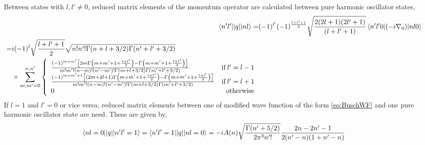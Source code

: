 \documentclass[%
 preprint,
 amsmath,amssymb,
 aps,
]{revtex4-1}
\begin{document}
Between states with $l,l'\neq0$, reduced matrix elements of the momentum operator are calculated between pure harmonic oscillator states,
\begin{align}
\braket{n'l' || q || n l}=&(-1)^{l'}(-1)^{\frac{l+l'+1}{2}}\sqrt{\frac{2(2l+1)(2l'+1)}{(l+l'+1)}}\braket{n'l'0| (-i \nabla_0) | n l 0} \\
\begin{split} =& i(-1)^{l}\sqrt{\frac{l+l'+1}{2}}\sqrt{n!n'!\Gamma(n+l+3/2)\Gamma(n'+l'+3/2)} \\ 
&\times\sum_{m,m'=0}^{n,n'} \left\{
     \begin{array}{lr}
       \frac{(-1)^{m+m'}\left[2m\Gamma\left(m+m'+1+\frac{l+l'}{2}\right)-\Gamma\left(m+m'+1+\frac{l+l'}{2}\right)\right]}{m!m'!(n-m)!(n'-m')!\Gamma(m+l+3/2)\Gamma(m'+l'+3/2)} & \text{if}\: l'=l-1 \\
        \frac{(-1)^{m+m'+1}\left[(2m+2l+1)\Gamma\left(m+m'+1+\frac{l+l'}{2}\right)-\Gamma\left(m+m'+1+\frac{l+l'}{2}\right)\right]}{m!m'!(n-m)!(n'-m')!\Gamma(m+l+3/2)\Gamma(m'+l'+3/2)} & \text{if}\: l'=l+1 \\
       0 & \text{otherwise}
     \end{array}
   \right.
   \end{split}
\end{align}
If $l=1$ and $l'=0$ or vice versa, reduced matrix elements between one of modified wave function of the form \eqref{eq:BuschWF} and one pure harmonic oscillator state are need. These are given by,
\begin{align}
\braket{n l=0 || q || n' l'=1}=\braket{n' l'=1 || q || n l=0}=-i A(n) \sqrt{\frac{\Gamma(n'+5/2)}{2\pi^3 n'!}}\frac{2n-2n'-1}{2(n'-n)(1+n'-n)}
\end{align}
\end{document}
